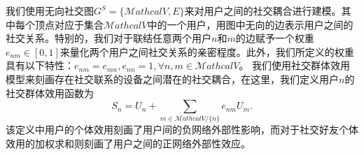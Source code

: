 我们使用无向社交图$G^S=\{\mathcal{M}athcal{V},E\}$来对用户之间的社交耦合进行建模。其中每个顶点对应于集合$\mathcal{M}athcal{V}$中的一个用户，用图中无向的边表示用户之间的社交关系。特别的，我们对于联结任意两个用户$n$和$m$的边赋予一个权重$e_{nm}\in [0,1]$来量化两个用户之间社交关系的亲密程度。此外，我们所定义的权重具有以下特性：$e_{nm}=e_{mn},e_{nn}=1, \forall n,m\in\mathcal{M}athcal{V}$。
我们使用社交群体效用模型来刻画存在社交联系的设备之间潜在的社交耦合，在这里，我们定义用户$n$的社交群体效用函数为
\vspace{-0.2cm}
\begin{equation}\label{sgu}
S_n=U_n+\sum_{m\in \mathcal{M}athcal{V}/\{n\}}e_{nm}U_m.
\end{equation}
该定义中用户的个体效用刻画了用户间的{\kaishu 负网络外部性}影响，而对于社交好友个体效用的加权求和则刻画了用户之间的{\kaishu 正网络外部性}效应。


